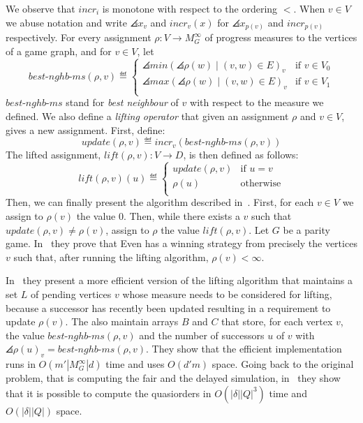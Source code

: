 We observe that $incr_i$ is monotone with respect to the ordering $<$.
When $v \in V$ we abuse notation and write $\angles{x}_v$ and $incr_v(x)$ for $\angles{x}_{p(v)}$
and $incr_{p(v)}$ respectively.
For every assignment $\rho: V \rightarrow M_G^{\infty}$ of progress measures to
the vertices of a game graph, and for $v \in V$, let
\[ best\text{-}nghb\text{-}ms(\rho,v) \eqdef
\begin{cases}
\angles{min(\angles{\rho(w) \;|\; (v,w) \in E})}_v &\mbox{if } v \in V_0 \\
\angles{max(\angles{\rho(w) \;|\; (v,w) \in E})}_v &\mbox{if } v \in V_1 \\
\end{cases} \]
$best\text{-}nghb\text{-}ms$ stand for \emph{best neighbour} of $v$
with respect to the measure we defined.
We also define a \emph{lifting operator} that given an assignment $\rho$ and
$v \in V$, gives a new assignment.
First, define:
\[ update(\rho,v) \eqdef incr_v(best\text{-}nghb\text{-}ms(\rho,v)) \]
The lifted assignment, $lift(\rho,v): V \rightarrow D$, is then defined as follows:
\[ lift(\rho,v)(u) \eqdef
\begin{cases}
update(\rho,v) &\mbox{if } u=v\\
\rho(u) &\mbox{otherwise}\\
\end{cases} \]
Then, we can finally present the algorithm described in~\cite{jurdzinski2000small}.
First, for each $v \in V$ we assign to $\rho(v)$ the value 0.
Then, while there exists a $v$ such that $update(\rho,v) \neq \rho(v)$, assign
to $\rho$ the value $lift(\rho,v)$.
Let $G$ be a parity game.
In~\cite{jurdzinski2000small} they prove that Even has a winning strategy
from precisely the vertices $v$ such that, after running the lifting algorithm,
$\rho(v) < \infty$.

In~\cite{etessami2005fair} they present a more efficient version of the lifting
algorithm that maintains a set $L$ of pending vertices $v$ whose measure needs to
be considered for lifting, because a successor has recently
been updated resulting in a requirement to update $\rho(v)$.
The also maintain arrays $B$ and $C$ that store, for each vertex $v$, the value
$best\text{-}nghb\text{-}ms(\rho,v)$ and the number of successors $u$ of $v$
with $\angles{\rho(u)}_v = best\text{-}nghb\text{-}ms(\rho,v)$.
They show that the efficient implementation runs in $O(m' |M_G^{\infty}| d)$ time
and uses $O(d'm)$ space.
Going back to the original problem, that is computing the fair and the delayed
simulation, in~\cite{etessami2005fair} they show that it is possible to compute
the quasiorders in $O(|\delta||Q|^3)$ time and $O(|\delta||Q|)$ space.

